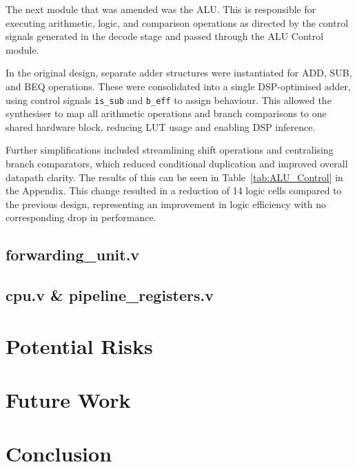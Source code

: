 \documentclass[a4paper,10pt]{article}
\begin{document}
The next module that was amended was the ALU. 
This is responsible for executing arithmetic, logic, 
and comparison operations as directed by the control signals 
generated in the decode stage and passed through the ALU Control module.

In the original design, separate adder structures 
were instantiated for ADD, SUB, and BEQ operations. 
These were consolidated into a single DSP-optimised adder, 
using control signals \texttt{is\_sub} and \texttt{b\_eff} to assign behaviour. 
This allowed the synthesiser to map all arithmetic operations and 
branch comparisons to one shared hardware block, reducing LUT usage 
and enabling DSP inference.

Further simplifications included streamlining shift operations 
and centralising branch comparators, which reduced conditional duplication 
and improved overall datapath clarity. 
The results of this can be seen in 
Table~\ref{tab:ALU_Control} in the Appendix. 
This change resulted in a reduction of 
14 logic cells compared to the previous design, 
representing an improvement in logic efficiency
with no corresponding drop in performance.

\subsection{forwarding\_unit.v}
\label{sec:forwarding_unit.v}

\subsection{cpu.v \& pipeline\_registers.v}
\label{sec:cpu.v_and_pipeline_registers.v}

\section{Potential Risks}
\label{sec:Potential_Risks}

\section{Future Work}
\label{sec:Future_Work}

\section{Conclusion}
\label{sec:Conclusion}
\end{document}
